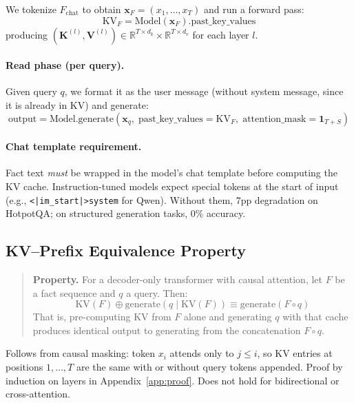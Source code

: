 \documentclass{article}
\begin{document}
We tokenize $F_{\text{chat}}$ to obtain $\mathbf{x}_F = (x_1, \ldots, x_T)$ and run a forward pass:
\begin{equation}
    \text{KV}_F = \text{Model}(\mathbf{x}_F).\text{past\_key\_values}
\end{equation}
producing $(\mathbf{K}^{(l)}, \mathbf{V}^{(l)}) \in \mathbb{R}^{T \times d_k} \times \mathbb{R}^{T \times d_v}$ for each layer $l$.

\paragraph{Read phase (per query).} Given query $q$, we format it as the user message (without system message, since it is already in KV) and generate:
\begin{equation}
    \text{output} = \text{Model.generate}(\mathbf{x}_q, \; \text{past\_key\_values}=\text{KV}_F, \; \text{attention\_mask}=\mathbf{1}_{T+S})
\end{equation}

\paragraph{Chat template requirement.} Fact text \textit{must} be wrapped in the model's chat template before computing the KV cache. Instruction-tuned models expect special tokens at the start of input (e.g., \texttt{<|im\_start|>system} for Qwen). Without them, 7pp degradation on HotpotQA; on structured generation tasks, 0\% accuracy.

\subsection{KV--Prefix Equivalence Property}

\begin{quote}
\textbf{Property.} For a decoder-only transformer with causal attention, let $F$ be a fact sequence and $q$ a query. Then:
$$\text{KV}(F) \oplus \text{generate}(q \mid \text{KV}(F)) \equiv \text{generate}(F \circ q)$$
That is, pre-computing KV from $F$ alone and generating $q$ with that cache produces identical output to generating from the concatenation $F \circ q$.
\end{quote}

Follows from causal masking: token $x_i$ attends only to $j \leq i$, so KV entries at positions $1, \ldots, T$ are the same with or without query tokens appended. Proof by induction on layers in Appendix~\ref{app:proof}. Does not hold for bidirectional or cross-attention.
\end{document}
